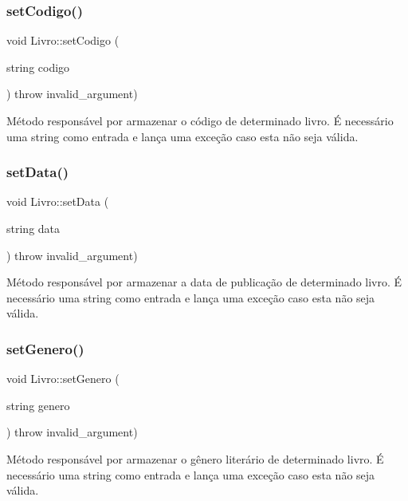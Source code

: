 \subsubsection{\texorpdfstring{set\+Codigo()}{setCodigo()}}
{\footnotesize\ttfamily void Livro\+::set\+Codigo (\begin{DoxyParamCaption}\item[{string}]{codigo }\end{DoxyParamCaption}) throw  invalid\+\_\+argument) \hspace{0.3cm}{\ttfamily [inline]}}

Método responsável por armazenar o código de determinado livro. É necessário uma string como entrada e lança uma exceção caso esta não seja válida. \mbox{\label{classLivro_a073f7124564707c5c36e9a44448aa13a}} 
\subsubsection{\texorpdfstring{set\+Data()}{setData()}}
{\footnotesize\ttfamily void Livro\+::set\+Data (\begin{DoxyParamCaption}\item[{string}]{data }\end{DoxyParamCaption}) throw  invalid\+\_\+argument) \hspace{0.3cm}{\ttfamily [inline]}}

Método responsável por armazenar a data de publicação de determinado livro. É necessário uma string como entrada e lança uma exceção caso esta não seja válida. \mbox{\label{classLivro_a642383a02f6a1dac3f69de8ac80184e7}} 
\subsubsection{\texorpdfstring{set\+Genero()}{setGenero()}}
{\footnotesize\ttfamily void Livro\+::set\+Genero (\begin{DoxyParamCaption}\item[{string}]{genero }\end{DoxyParamCaption}) throw  invalid\+\_\+argument) \hspace{0.3cm}{\ttfamily [inline]}}

Método responsável por armazenar o gênero literário de determinado livro. É necessário uma string como entrada e lança uma exceção caso esta não seja válida. \mbox{\label{classLivro_adbae26ce6938e1f56ed6d88b458351c7}} 
